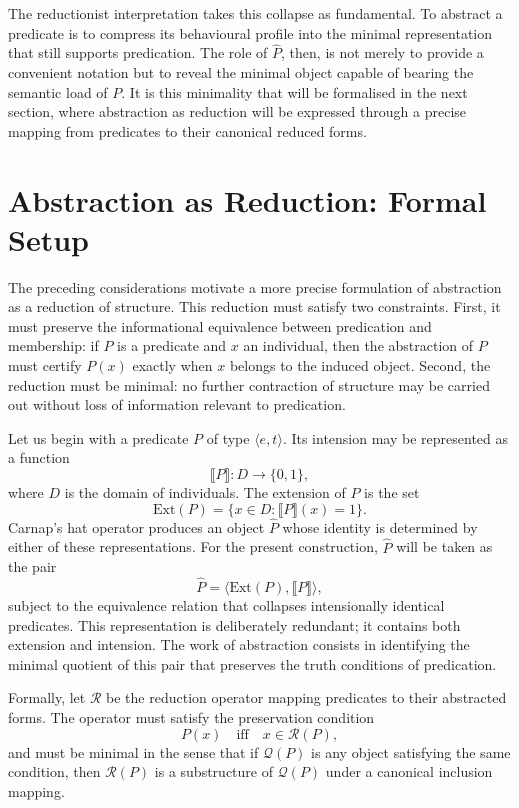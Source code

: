 \documentclass[12pt,letterpaper]{article}
\begin{document}
The reductionist interpretation takes this collapse as fundamental. To abstract a predicate is to compress its behavioural profile into the minimal representation that still supports predication. The role of $\hat{P}$, then, is not merely to provide a convenient notation but to reveal the minimal object capable of bearing the semantic load of $P$. It is this minimality that will be formalised in the next section, where abstraction as reduction will be expressed through a precise mapping from predicates to their canonical reduced forms.

\section{Abstraction as Reduction: Formal Setup}

The preceding considerations motivate a more precise formulation of abstraction as a reduction of structure. This reduction must satisfy two constraints. First, it must preserve the informational equivalence between predication and membership: if $P$ is a predicate and $x$ an individual, then the abstraction of $P$ must certify $P(x)$ exactly when $x$ belongs to the induced object. Second, the reduction must be minimal: no further contraction of structure may be carried out without loss of information relevant to predication.

Let us begin with a predicate $P$ of type $\langle e, t \rangle$. Its intension may be represented as a function
\[
\llbracket P \rrbracket : D \to \{0,1\},
\]
where $D$ is the domain of individuals. The extension of $P$ is the set
\[
\mathrm{Ext}(P) = \{ x \in D : \llbracket P \rrbracket(x) = 1 \}.
\]
Carnap’s hat operator produces an object $\hat{P}$ whose identity is determined by either of these representations. For the present construction, $\hat{P}$ will be taken as the pair
\[
\hat{P} = \langle \mathrm{Ext}(P), \llbracket P \rrbracket \rangle,
\]
subject to the equivalence relation that collapses intensionally identical predicates. This representation is deliberately redundant; it contains both extension and intension. The work of abstraction consists in identifying the minimal quotient of this pair that preserves the truth conditions of predication.

Formally, let $\mathcal{R}$ be the reduction operator mapping predicates to their abstracted forms. The operator must satisfy the preservation condition
\[
P(x) \quad \text{iff} \quad x \in \mathcal{R}(P),
\]
and must be minimal in the sense that if $\mathcal{Q}(P)$ is any object satisfying the same condition, then $\mathcal{R}(P)$ is a substructure of $\mathcal{Q}(P)$ under a canonical inclusion mapping.
\end{document}
